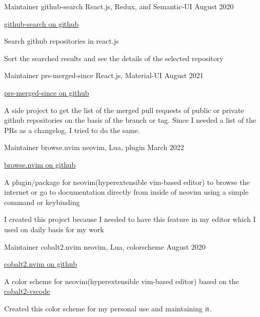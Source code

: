 \begin{cventries}
  \cventry
    {Maintainer }
    {github-search}
    {React.js, Redux, and Semantic-UI}
    {August 2020}
    {
      \begin{cvitems}
      \item{\href{https://github.com/lalitmee/github-search}{github-search on github}}
        \item {Search github repositories in react.js}
        \item {Sort the searched results and see the details of the selected repository}
      \end{cvitems}
     }
  \cventry
    {Maintainer }
    {prs-merged-since}
    {React.js, Material-UI}
    {August 2021}
    {
      \begin{cvitems}
      \item{\href{https://github.com/lalitmee/prs-merged-since}{prs-merged-since on github}}
        \item {A side project to get the list of the merged pull requests of public or private github repositories on the basis of the branch or tag. Since I needed a list of the PRs as a changelog, I tried to do the same.}
      \end{cvitems}
     }
  \cventry
    {Maintainer}
    {browse.nvim}
    {neovim, Lua, plugin}
    {March 2022}
    {
      \begin{cvitems}
          \item{\href{https://github.com/lalitmee/browse.nvim}{browse.nvim on github}}
          \item{A plugin/package for neovim(hyperextensible vim-based editor) to browse the internet or go to documentation directly from inside of neovim using a simple command or keybinding}
          \item{I created this project because I needed to have this feature in my editor which I used on daily basis for my work}
      \end{cvitems}
    }
  \cventry
    {Maintainer}
    {cobalt2.nvim}
    {neovim, Lua, colorscheme}
    {August 2020}
    {
      \begin{cvitems}
      \item{\href{https://github.com/lalitmee/cobalt2.nvim}{cobalt2.nvim on github}}
        \item {A color scheme for neovim(hyperextensible vim-based editor) based on the \href{https://github.com/wesbos/cobalt2-vscode}{cobalt2-vscode}}
        \item {Created this color scheme for my personal use and maintaining it.}
      \end{cvitems}
     }
\end{cventries}